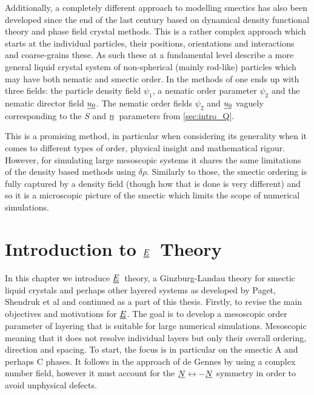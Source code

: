 \documentclass[12pt]{article}
\newcommand{\suf}[2]{\stackunder[0.5pt]{\stackunder[1pt]{\ensuremath{#1}}{\rule{\widthof{\ensuremath{#2}}*\real{0.9}}{.1ex}}}{}}
\newcommand{\duf}[2]{\stackunder[0.5pt]{\stackunder[0.8pt]{\stackunder[1pt]{\ensuremath{#1}}{\rule{\widthof{\ensuremath{#2}}*\real{0.9}}{.1ex}}}{\rule{\widthof{\ensuremath{#2}}*\real{0.9}}{.1ex}}}{}}
\newcommand{\su}[1]{\suf{#1}{#1}}
\newcommand{\du}[1]{\duf{#1}{#1}}
\newcommand{\nn}{\ensuremath{\su{n}}}
\newcommand{\EE}{\ensuremath{\du{E}}}
\begin{document}
        Additionally, a completely different approach to modelling smectics has also been developed since the end of the last century based on dynamical density functional theory and phase field crystal methods\cite{lowenPhasefieldcrystalModelLiquid2010,elderModelingElasticPlastic2004,achimStabilityLiquidCrystalline2011,vitralPhasefieldModelWeakly2021,nestlerActiveSmecticsSphere2023}.
        This is a rather complex approach which starts at the individual particles, their positions, orientations and interactions and coarse-grains these.
        As such these at a fundamental level describe a more general liquid crystal system of non-spherical (mainly rod-like) particles which may have both nematic and smectic order.
        In the methods of \cite{lowenPhasefieldcrystalModelLiquid2010} one ends up with three fields: the particle density field $\psi_1$, a nematic order parameter $\psi_2$ and the nematic director field $\su{u_0}$.
        The nematic order fields $\psi_2$ and $\su{u_0}$ vaguely corresponding to the $S$ and \nn\ parameters from \cref{sec:intro_Q}.

        This is a promising method, in particular when considering its generality when it comes to different types of order, physical insight and mathematical rigour.
        However, for simulating large mesoscopic systems it shares the same limitations of the density based methods using $\delta\rho$.
        Similarly to those, the smectic ordering is fully captured by a density field (though how that is done is very different) and so it is a microscopic picture of the smectic which limits the scope of numerical simulations.


\section{Introduction to \EE\ Theory}\label{sec:Ei}
    In this chapter we introduce \EE\ theory, a Ginzburg-Landau theory for smectic liquid crystals and perhaps other layered systems as developed by Paget, Shendruk et al\cite{pagetComplexTensorsSimple2023,pagetSmecticLayeringLandau2022,pagetComplextensorTheorySimple2023} and continued as a part of this thesis.
    Firstly, to revise the main objectives and motivations for \EE.
    The goal is to develop a mesoscopic order parameter of layering that is suitable for large numerical simulations.
    Mesoscopic meaning that it does not resolve individual layers but only their overall ordering, direction and spacing.
    To start, the focus is in particular on the smectic A and perhaps C phases.
    It follows in the approach of de Gennes by using a complex number field, however it must account for the $\su{N} \leftrightarrow -\su{N}$ symmetry in order to avoid unphysical defects.
\end{document}
